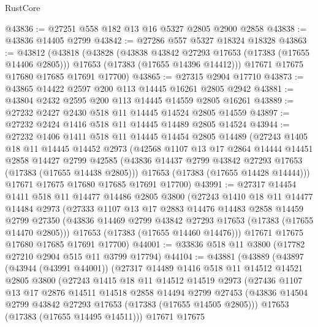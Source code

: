 \begin{lexlean}{RustCore}
\begin{coremodule}
@43836 := @27251 @558 @182 @13 @16 @5327 @2805 @2900 @2858
@43838 := @43836 @14405 @2799
@43842 := @27286 @557 @5327 @18324 @18328
@43863 := @43812
    (@43818
      (@43828
        (@43838 @43842 @27293 @17653 (@17383 (@17655 @14406 @2805)))
        @17653
        (@17383 (@17655 @14396 @14412)))
      @17671
      @17675
      @17680
      @17685
      @17691
      @17700)
@43865 := @27315 @2904 @17710
@43873 := @43865 @14422 @2597 @200 @113 @14445 @16261 @2805 @2942
@43881 := @43804 @2432 @2595 @200 @113 @14445 @14559 @2805 @16261
@43889 := @27232 @2427 @2430 @518 @11 @14445 @14524 @2805 @14559
@43897 := @27232 @2424 @1416 @518 @11 @14445 @14489 @2805 @14524
@43944 := @27232
    @1406
    @1411
    @518
    @11
    @14445
    @14454
    @2805
    @14489
    (@27243
      @1405
      @18
      @11
      @14445
      @14452
      @2973
      (@42568
        @1107
        @13
        @17
        @2864
        @14444
        @14451
        @2858
        @14427
        @2799
        @42585
        (@43836 @14437 @2799 @43842 @27293 @17653 (@17383 (@17655 @14438 @2805)))
        @17653
        (@17383 (@17655 @14428 @14444)))
      @17671
      @17675
      @17680
      @17685
      @17691
      @17700)
@43991 := @27317
    @14454
    @1411
    @518
    @11
    @14477
    @14486
    @2805
    @3800
    (@27243
      @1410
      @18
      @11
      @14477
      @14484
      @2973
      (@27333
        @1107
        @13
        @17
        @2883
        @14476
        @14483
        @2858
        @14459
        @2799
        @27350
        (@43836 @14469 @2799 @43842 @27293 @17653 (@17383 (@17655 @14470 @2805)))
        @17653
        (@17383 (@17655 @14460 @14476)))
      @17671
      @17675
      @17680
      @17685
      @17691
      @17700)
@44001 := @33836 @518 @11 @3800 (@17782 @27210 @2904 @515 @11 @3799 @17794)
@44104 := @43881
    (@43889
      (@43897
        (@43944 (@43991 @44001))
        (@27317
          @14489
          @1416
          @518
          @11
          @14512
          @14521
          @2805
          @3800
          (@27243
            @1415
            @18
            @11
            @14512
            @14519
            @2973
            (@27436
              @1107
              @13
              @17
              @2876
              @14511
              @14518
              @2858
              @14494
              @2799
              @27453
              (@43836 @14504 @2799 @43842 @27293 @17653 (@17383 (@17655 @14505 @2805)))
              @17653
              (@17383 (@17655 @14495 @14511)))
            @17671
            @17675

\end{coremodule}
\end{lexlean}
